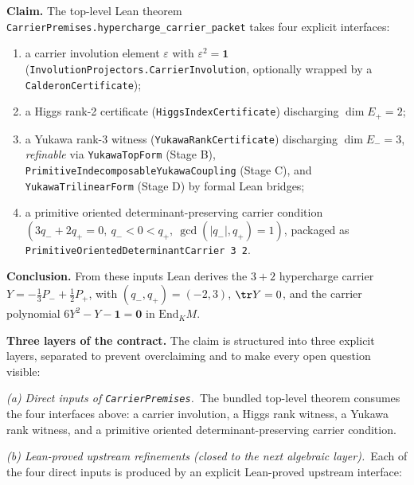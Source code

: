 \begin{tfptclaimcontract}
\textbf{Claim.}
The top-level Lean theorem
\texttt{CarrierPremises.hypercharge\_carrier\_packet} takes
four explicit interfaces:

\begin{enumerate}[leftmargin=1.5em, itemsep=0pt, label=(\arabic*)]
\item a carrier involution element $\varepsilon$ with
      $\varepsilon^2 = \mathbf 1$
      (\texttt{InvolutionProjectors.CarrierInvolution}, optionally
      wrapped by a \texttt{CalderonCertificate});
\item a Higgs rank-2 certificate
      (\texttt{HiggsIndexCertificate}) discharging $\dim E_+ = 2$;
\item a Yukawa rank-3 witness
      (\texttt{YukawaRankCertificate}) discharging $\dim E_- = 3$,
      \emph{refinable} via \texttt{YukawaTopForm} (Stage B),
      \texttt{PrimitiveIndecomposableYukawaCoupling} (Stage C),
      and \texttt{YukawaTrilinearForm} (Stage D) by formal Lean
      bridges;
\item a primitive oriented determinant-preserving carrier
      condition
      $(3 q_- + 2 q_+ = 0,\ q_- < 0 < q_+,\ \gcd(|q_-|,q_+) = 1)$,
      packaged as
      \texttt{PrimitiveOrientedDeterminantCarrier 3 2}.
\end{enumerate}

\textbf{Conclusion.}
From these inputs Lean derives the $3+2$ hypercharge carrier
$Y = -\tfrac13 P_- + \tfrac12 P_+$, with $(q_-,q_+) = (-2, 3)$,
$\tr Y = 0$, and the carrier polynomial
$6 Y^2 - Y - \mathbf 1 = \mathbf 0$ in $\mathrm{End}_K M$.

\textbf{Three layers of the contract.}
The claim is structured into three explicit layers, separated to
prevent overclaiming and to make every open question visible:

\smallskip
\noindent
\emph{(a) Direct inputs of \texttt{CarrierPremises}.}\ The
bundled top-level theorem consumes the four interfaces above:
a carrier involution, a Higgs rank witness, a Yukawa rank
witness, and a primitive oriented determinant-preserving
carrier condition.

\smallskip
\noindent
\emph{(b) Lean-proved upstream refinements (closed to the
next algebraic layer).}\ Each of the four direct inputs is
produced by an explicit Lean-proved upstream interface:


\end{tfptclaimcontract}
